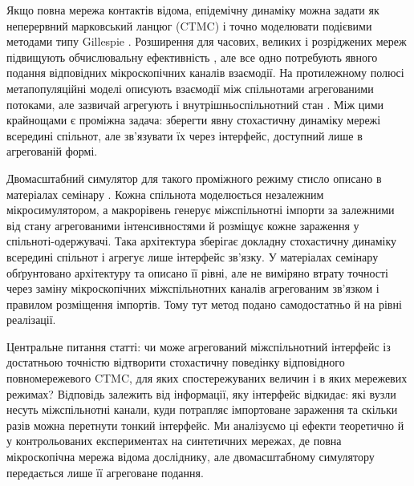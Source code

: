 Якщо повна мережа контактів відома, епідемічну динаміку можна задати як неперервний марковський ланцюг (CTMC) і точно моделювати подієвими методами типу Gillespie \citep{gillespie1977exact,gibson2000}. Розширення для часових, великих і розріджених мереж підвищують обчислювальну ефективність \citep{vestergaard2015,kuryliak2025simulating}, але все одно потребують явного подання відповідних мікроскопічних каналів взаємодії. На протилежному полюсі метапопуляційні моделі описують взаємодії між спільнотами агрегованими потоками, але зазвичай агрегують і внутрішньоспільнотний стан \citep{colizza2007reaction,colizza2008,balcan2010modeling,ajelli2010}. Між цими крайнощами є проміжна задача: зберегти явну стохастичну динаміку мережі всередині спільнот, але зв'язувати їх через інтерфейс, доступний лише в агрегованій формі.

Двомасштабний симулятор для такого проміжного режиму стисло описано в матеріалах семінару \citep{kuryliak2025towards}. Кожна спільнота моделюється незалежним мікросимулятором, а макрорівень генерує міжспільнотні імпорти за залежними від стану агрегованими інтенсивностями й розміщує кожне зараження у спільноті-одержувачі. Така архітектура зберігає докладну стохастичну динаміку всередині спільнот і агрегує лише інтерфейс зв'язку. У матеріалах семінару обґрунтовано архітектуру та описано її рівні, але не виміряно втрату точності через заміну мікроскопічних міжспільнотних каналів агрегованим зв'язком і правилом розміщення імпортів. Тому тут метод подано самодостатньо й на рівні реалізації.

Центральне питання статті: чи може агрегований міжспільнотний інтерфейс із достатньою точністю відтворити стохастичну поведінку відповідного повномережевого CTMC, для яких спостережуваних величин і в яких мережевих режимах? Відповідь залежить від інформації, яку інтерфейс відкидає: які вузли несуть міжспільнотні канали, куди потрапляє імпортоване зараження та скільки разів можна перетнути тонкий інтерфейс. Ми аналізуємо ці ефекти теоретично й у контрольованих експериментах на синтетичних мережах, де повна мікроскопічна мережа відома досліднику, але двомасштабному симулятору передається лише її агреговане подання.

